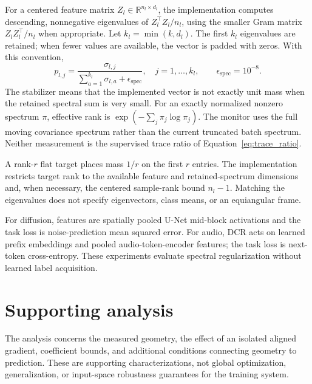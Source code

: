 \documentclass[a4paper,fleqn]{cas-dc}
\newcommand{\R}{\mathbb{R}}
\newcommand{\epsp}{\epsilon_{\mathrm{spec}}}
\begin{document}
For a centered feature matrix $Z_l\in\R^{n_l\times d_l}$,
the implementation computes descending, nonnegative eigenvalues
of $Z_l^\top Z_l/n_l$, using the smaller Gram matrix
$Z_l Z_l^\top/n_l$ when appropriate. Let
$k_l=\min(k,d_l)$. The first $k_l$ eigenvalues are retained;
when fewer values are available, the vector is padded with zeros.
With this convention,
\begin{equation}
 p_{l,j}=
 \frac{\sigma_{l,j}}
 {\sum_{a=1}^{k_l}\sigma_{l,a}+\epsp},
 \quad j=1,\ldots,k_l,
 \qquad \epsp=10^{-8}.
 \label{eq:spectrum_normalization}
\end{equation}
The stabilizer means that the implemented vector is not exactly
unit mass when the retained spectral sum is very small.
For an exactly normalized nonzero spectrum $\pi$,
effective rank is $\exp(-\sum_j\pi_j\log\pi_j)$.
The monitor uses the full moving covariance spectrum rather than
the current truncated batch spectrum. Neither measurement is the
supervised trace ratio of Equation~\eqref{eq:trace_ratio}.

A rank-$r$ flat target places mass $1/r$ on the first $r$ entries.
The implementation restricts target rank to the available feature
and retained-spectrum dimensions and, when necessary, the centered
sample-rank bound $n_l-1$. Matching the eigenvalues does not specify
eigenvectors, class means, or an equiangular frame.

For diffusion, features are spatially pooled U-Net mid-block
activations and the task loss is noise-prediction mean squared error.
For audio, DCR acts on learned prefix embeddings and pooled
audio-token-encoder features; the task loss is next-token
cross-entropy. These experiments evaluate spectral regularization
without learned label acquisition.


\section{Supporting analysis}\label{sec:theory}

The analysis concerns the measured geometry, the effect of an isolated
aligned gradient, coefficient bounds, and additional conditions
connecting geometry to prediction. These are supporting
characterizations, not global optimization, generalization, or
input-space robustness guarantees for the training system.
\end{document}
